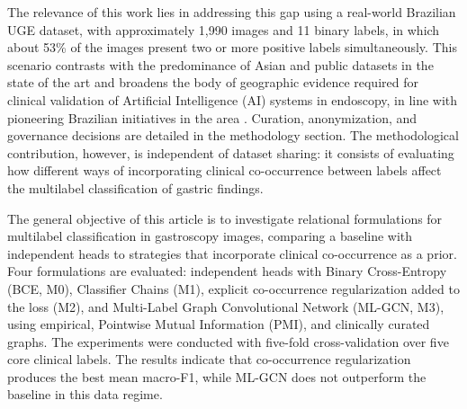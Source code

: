 \documentclass[12pt]{article}
\begin{document}
The relevance of this work lies in addressing this gap using a real-world Brazilian UGE dataset, with approximately 1,990 images and 11 binary labels, in which about 53\% of the images present two or more positive labels simultaneously. This scenario contrasts with the predominance of Asian and public datasets in the state of the art and broadens the body of geographic evidence required for clinical validation of Artificial Intelligence (AI) systems in endoscopy, in line with pioneering Brazilian initiatives in the area \cite{9926791,10373486}. Curation, anonymization, and governance decisions are detailed in the methodology section. The methodological contribution, however, is independent of dataset sharing: it consists of evaluating how different ways of incorporating clinical co-occurrence between labels affect the multilabel classification of gastric findings.


The general objective of this article is to investigate relational formulations for multilabel classification in gastroscopy images, comparing a baseline with independent heads to strategies that incorporate clinical co-occurrence as a prior. Four formulations are evaluated: independent heads with Binary Cross-Entropy (BCE, M0), Classifier Chains (M1), explicit co-occurrence regularization added to the loss (M2), and Multi-Label Graph Convolutional Network (ML-GCN, M3), using empirical, Pointwise Mutual Information (PMI), and clinically curated graphs. The experiments were conducted with five-fold cross-validation over five core clinical labels. The results indicate that co-occurrence regularization produces the best mean macro-F1, while ML-GCN does not outperform the baseline in this data regime.
\end{document}
